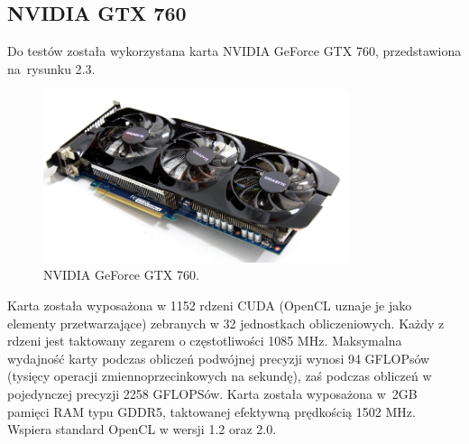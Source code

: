 \subsection{NVIDIA GTX 760}
Do testów została wykorzystana karta NVIDIA GeForce GTX 760, przedstawiona na~rysunku 2.3. \\
\begin{figure}[h]
\centering
\includegraphics[width=0.8\textwidth]{figures/gtx.png}
\caption{NVIDIA GeForce GTX 760\protect\cite{gtx}.}%
\label{rys:NVIDIA GeForce GTX 760}
\end{figure}
\newline Karta została wyposażona w 1152 rdzeni CUDA (OpenCL uznaje je jako elementy przetwarzające) zebranych w 32 jednostkach obliczeniowych. Każdy z rdzeni jest taktowany zegarem o częstotliwości 1085 MHz. Maksymalna wydajność karty podczas obliczeń podwójnej precyzji wynosi 94 GFLOPsów (tysięcy operacji zmiennoprzecinkowych na sekundę), zaś podczas obliczeń w pojedynczej precyzji 2258 GFLOPSów. Karta została wyposażona w~2GB pamięci RAM typu GDDR5, taktowanej efektywną prędkością 1502 MHz. Wspiera standard OpenCL w wersji 1.2 oraz 2.0\cite{gtx}.\\
\newpage
